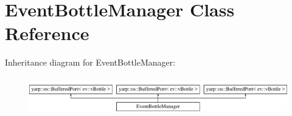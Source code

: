\hypertarget{classEventBottleManager}{}\section{Event\+Bottle\+Manager Class Reference}
\label{classEventBottleManager}
Inheritance diagram for Event\+Bottle\+Manager\+:\begin{figure}[H]
\begin{center}
\leavevmode
\includegraphics[height=1.659259cm]{classEventBottleManager}
\end{center}
\end{figure}
